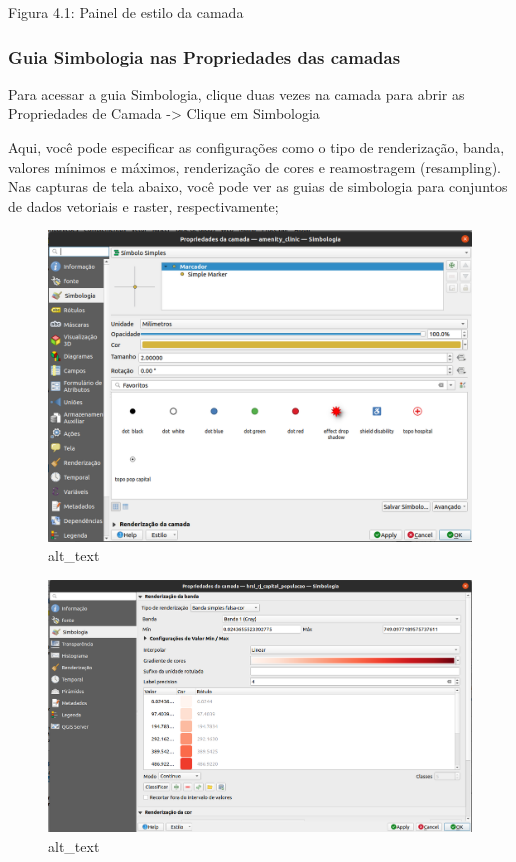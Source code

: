 \documentclass[
]{book}
\begin{document}
Figura 4.1: Painel de estilo da camada

\hypertarget{guia-simbologia-nas-propriedades-das-camadas}{%
\subsubsection{\texorpdfstring{\textbf{Guia Simbologia nas Propriedades das camadas}}{Guia Simbologia nas Propriedades das camadas}}\label{guia-simbologia-nas-propriedades-das-camadas}}

Para acessar a guia Simbologia, clique duas vezes na camada para abrir as Propriedades de Camada -\textgreater{} Clique em Simbologia

Aqui, você pode especificar as configurações como o tipo de renderização, banda, valores mínimos e máximos, renderização de cores e reamostragem (resampling). Nas capturas de tela abaixo, você pode ver as guias de simbologia para conjuntos de dados vetoriais e raster, respectivamente;

\begin{figure}
\centering
\includegraphics{media/modulo4/style-vector.png}
\caption{alt\_text}
\end{figure}

\begin{figure}
\centering
\includegraphics{media/modulo4/style-raster.png}
\caption{alt\_text}
\end{figure}
\end{document}

